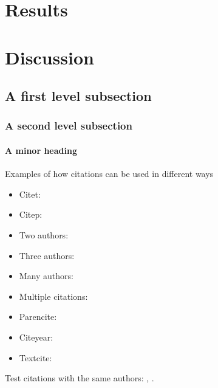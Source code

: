 \documentclass{mpi-far}
\begin{document}
\section{Results}
\section{Discussion}

\subsection{A first level subsection}
\subsubsection{A second level subsection}
\lipsum[3] 
\paragraph{A minor heading}
\lipsum[5] 

Examples of how citations can be used in different ways

\begin{itemize}
  \item Citet: \citet{baker_nzclassification_2010}
  \item Citep: \citep{doc_sealion_2009}
  \item Two authors: \citep{abraham_summary_98-09}
  \item Three authors: \citep{thompson_dolphin_2013}
  \item Many authors: \citep{baker_global_2007}
  \item Multiple citations: \citep{baker_global_2007, abraham_summary_98-09, thompson_dolphin_2013} 
  \item Parencite: \parencite{gales_phocarctos_2008}
  \item Citeyear: \citeyear{robertson_population_2011}
  \item Textcite: \textcite{roe_necropsy_2007}
\end{itemize}


Test citations with the same authors: \citep{ono2015marine,ono2015think,ono2015space},
\citet{ono2015marine,ono2015think,ono2015space}.
\end{document}
